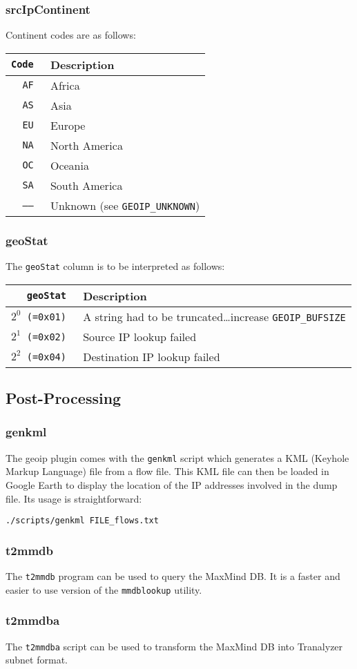 \documentclass[documentation]{subfiles}
\begin{document}
\subsubsection{srcIpContinent}\label{srcIpContinent}
Continent codes are as follows:
\begin{longtable}{>{\tt}rl}
    \toprule
    {\bf Code} & {\bf Description}\\
    \midrule\endhead%
    AF & Africa\\
    AS & Asia\\
    EU & Europe\\
    NA & North America\\
    OC & Oceania\\
    SA & South America\\
    --{}-- & Unknown (see {\tt GEOIP\_UNKNOWN})\\
    \bottomrule
\end{longtable}

\subsubsection{geoStat}\label{geoStat}
The {\tt geoStat} column is to be interpreted as follows:
\begin{longtable}{>{\tt}rl}
    \toprule
    {\bf geoStat} & {\bf Description}\\
    \midrule\endhead%
    $2^0$ (=0x01) & A string had to be truncated\ldots increase {\tt GEOIP\_BUFSIZE}\\
    $2^1$ (=0x02) & Source IP lookup failed\\
    $2^2$ (=0x04) & Destination IP lookup failed\\
    \bottomrule
\end{longtable}

\subsection{Post-Processing}

\subsubsection{genkml}
The geoip plugin comes with the {\tt genkml} script which generates a KML (Keyhole Markup Language) file from a flow file.
This KML file can then be loaded in Google Earth to display the location of the IP addresses involved in the dump file. Its usage
is straightforward:

\begin{center}
    {\tt ./scripts/genkml FILE\_flows.txt}
\end{center}

\subsubsection{t2mmdb}
The {\tt t2mmdb} program can be used to query the MaxMind DB. It is a faster and easier to use version of the {\tt mmdblookup} utility.

\subsubsection{t2mmdba}
The {\tt t2mmdba} script can be used to transform the MaxMind DB into Tranalyzer subnet format.
\end{document}
